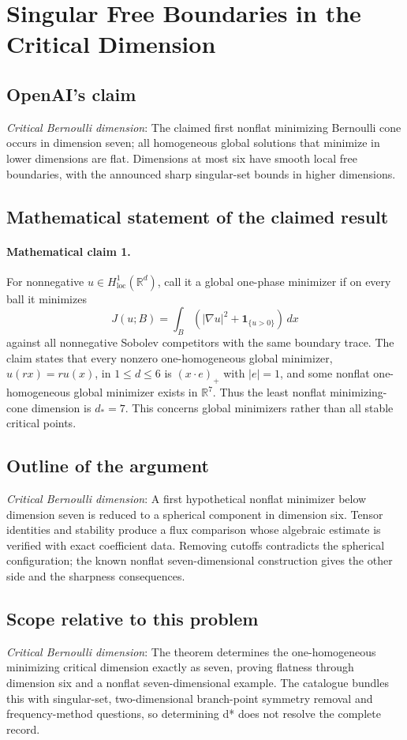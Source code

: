 \documentclass[11pt]{article}
\begin{document}
\section*{Singular Free Boundaries in the Critical Dimension}

\subsection{OpenAI's claim}
\textit{Critical Bernoulli dimension}: The claimed first nonflat minimizing Bernoulli cone occurs in dimension seven; all homogeneous global solutions that minimize in lower dimensions are flat. Dimensions at most six have smooth local free boundaries, with the announced sharp singular-set bounds in higher dimensions.

\subsection{Mathematical statement of the claimed result}
\paragraph{Mathematical claim 1.} For nonnegative $u\in H^1_{\mathrm{loc}}(\mathbb R^d)$, call it a global one-phase minimizer if on every ball it minimizes \[J(u;B)=\int_B(|\nabla u|^2+\mathbf1_{\{u>0\}})\,dx\] against all nonnegative Sobolev competitors with the same boundary trace. The claim states that every nonzero one-homogeneous global minimizer, $u(rx)=ru(x)$, in $1\le d\le6$ is $(x\cdot e)_+$ with $|e|=1$, and some nonflat one-homogeneous global minimizer exists in $\mathbb R^7$. Thus the least nonflat minimizing-cone dimension is $d_*=7$. This concerns global minimizers rather than all stable critical points.

\subsection{Outline of the argument}
\textit{Critical Bernoulli dimension}: A first hypothetical nonflat minimizer below dimension seven is reduced to a spherical component in dimension six. Tensor identities and stability produce a flux comparison whose algebraic estimate is verified with exact coefficient data. Removing cutoffs contradicts the spherical configuration; the known nonflat seven-dimensional construction gives the other side and the sharpness consequences.

\subsection{Scope relative to this problem}
\textit{Critical Bernoulli dimension}: The theorem determines the one-homogeneous minimizing critical dimension exactly as seven, proving flatness through dimension six and a nonflat seven-dimensional example. The catalogue bundles this with singular-set, two-dimensional branch-point symmetry removal and frequency-method questions, so determining d* does not resolve the complete record.
\end{document}
